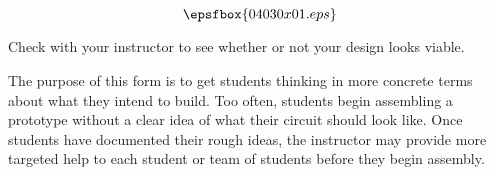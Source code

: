 

$$\epsfbox{04030x01.eps}$$

\vfil \eject






Check with your instructor to see whether or not your design looks viable.







The purpose of this form is to get students thinking in more concrete terms about what they intend to build.  Too often, students begin assembling a prototype without a clear idea of what their circuit should look like.  Once students have documented their rough ideas, the instructor may provide more targeted help to each student or team of students before they begin assembly.




